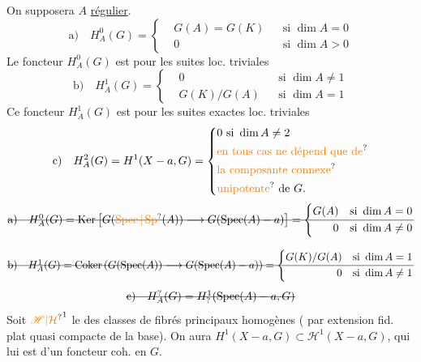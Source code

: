 On supposera $A$ \uline{régulier}.
\[
\text{a)}\quad H_A^0(G)=\left\{\begin{aligned}
&G(A)=G(K)&&\text{si }\dim A=0\\
&0&&\text{si }\dim A>0
\end{aligned}\right.
\]
Le foncteur $H_A^0(G)$ est  pour les suites   loc. triviales
\[
\text{b)}\quad H_A^1(G)=\left\{\begin{aligned}
&0&&\text{si }\dim A\neq1\\
&G(K)/G(A)&&\text{si }\dim A=1
\end{aligned}\right.
\]
Ce foncteur $H_A^1(G)$ est  pour les suites exactes loc. triviales
\[
\text{c)}\quad H_A^2(G)=H^1(X-a,G)=\left\{\begin{aligned}
&0\text{ si }\dim A\neq2\\
&\text{\unsure{en tous cas ne dépend que de}}\\
&\text{\unsure{la composante connexe}}\\
&\text{\unsure{unipotente} de }G.
\end{aligned}\right.
\]
\[
\deleted{\text{a)}\quad H_A^0(G)=\operatorname{Ker}\left[G(\unsure{\operatorname{Spec}|\operatorname{Sp}}(A))\longrightarrow G(\operatorname{Spec}(A)-a)\right]=\left\{\begin{aligned}G(A)&\quad\text{si }\dim A=0\\0&\quad\text{si }\dim A\neq0\end{aligned}\right.}
\]

\[
\deleted{\text{b)}\quad H_A^1(G)=\operatorname{Coker}\left(G(\operatorname{Spec}(A))\longrightarrow G(\operatorname{Spec}(A)-a)\right)=\left\{\begin{aligned}G(K)/G(A)&\quad\text{si }\dim A=1\\0&\quad\text{si }\dim A\neq1\end{aligned}\right.}
\]
\[
\deleted{\text{c)}\quad H_A^{?}(G)=H^1_{?}(\operatorname{Spec}(A)-a,G)}
\]
Soit ${\unsure{\mathscr H|\mathcal H}}^1$ le   des classes de fibrés principaux homogènes ( par extension fid. plat quasi compacte de la base). On aura $H^1(X-a,G)\subset\mathscr H^1(X-a,G)$, qui lui est  d'un foncteur coh. en $G$.

